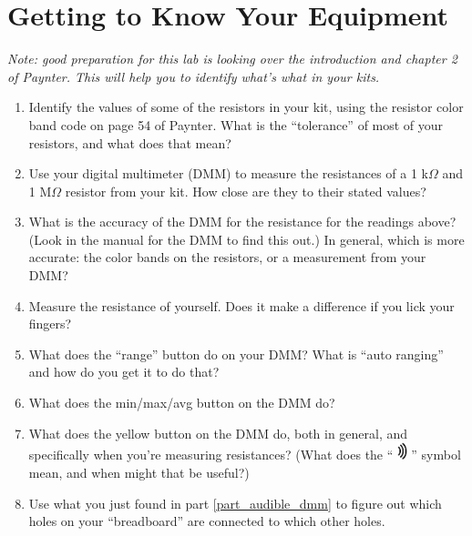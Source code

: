 \section{Getting to Know Your Equipment}
\label{lab_equipment}


\bigskip

\textit{Note: good preparation for this lab is looking over the introduction and chapter 2 of Paynter.  This will help you to identify what's what in your kits.}

\begin{enumerate}[wide]

\item Identify the values of some of the resistors in your kit, using the resistor color band code on page 54 of Paynter.  What is the ``tolerance'' of most of your resistors, and what does that mean?   

\item Use your digital multimeter (DMM) to measure the resistances of a 1 k$\Omega$ and 1 M$\Omega$ resistor from your kit.  How close are they to their stated values?

\item What is the accuracy of the DMM for the resistance for the readings above?  (Look in the manual for the DMM to find this out.)  In general, which is more accurate: the color bands on the resistors, or a measurement from your DMM?

\item Measure the resistance of yourself.  Does it make a difference if you lick your fingers?  

\item What does the ``range'' button do on your DMM?  What is ``auto ranging'' and how do you get it to do that?

\item What does the min/max/avg button on the DMM do?

\item What does the yellow button on the DMM do, both in general, and specifically when you're measuring resistances?  (What does the ``
\includegraphics[height=0.2in]{equipment/sound.eps}
'' symbol mean, and when might that be useful?) \label{part_audible_dmm}

\item Use what you just found in part \ref{part_audible_dmm} to figure out which holes on your ``breadboard'' are connected to which other holes.   


\end{enumerate}
